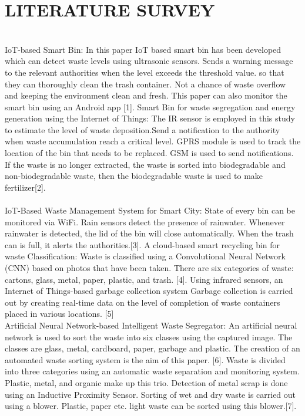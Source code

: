 \chapter{LITERATURE SURVEY}
\thispagestyle{empty}
\\
\hspace{.2cm}  IoT-based Smart Bin: In this paper IoT based smart bin has been developed
which can detect waste levels using ultrasonic sensors. Sends a warning message to the relevant authorities when the level exceeds the threshold value.
so that they can thoroughly clean the trash container. Not a chance of waste overflow and keeping the
environment clean and fresh. This paper can also monitor the smart bin using an
Android app [1]. Smart Bin for waste segregation and energy generation using the
Internet of Things: The IR sensor is employed in this study to estimate the level of waste deposition.Send a notification to the authority when waste accumulation reach a critical level. GPRS module is used to track the location of the bin that
needs to be replaced. GSM is used to send notifications. If the waste is no longer
extracted, the waste is sorted into biodegradable and non-biodegradable waste,
then the biodegradable waste is used to make fertilizer[2].\\ \\
\hspace{.2cm} IoT-Based Waste Management System for Smart City: State of every bin can
be monitored via WiFi. Rain sensors detect the presence of rainwater. Whenever
rainwater is detected, the lid of the bin will close automatically. When the trash can is full, it alerts the authorities.[3]. A cloud-based smart recycling
bin for waste Classification: Waste is classified using a Convolutional Neural Network (CNN) based on photos that have been taken. There are six categories of waste: cartons, glass, metal, paper, plastic, and trash. [4]. Using infrared sensors, an Internet of Things-based garbage collection system Garbage collection is carried out by creating real-time data on the level of completion of waste containers placed in various locations. [5]\\

Artificial Neural Network-based Intelligent Waste Segregator: An artificial
neural network is used to sort the waste into six classes using the captured image.
The classes are glass, metal, cardboard, paper, garbage and plastic. The creation of an automated waste sorting system is the aim of this paper. [6]. Waste is divided into three categories using an automatic waste separation and monitoring system.
Plastic, metal, and organic make up this trio. Detection of metal scrap is done using an Inductive Proximity Sensor. Sorting of wet and dry waste is carried out using a blower.
Plastic, paper etc. light waste can be sorted using this blower.[7].\\


